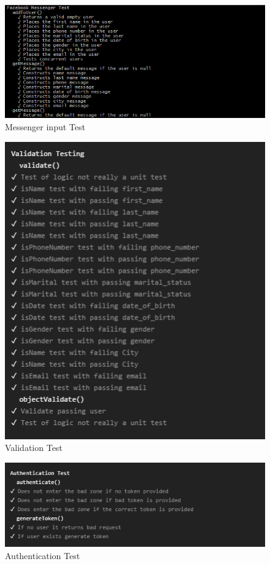 \documentclass{article}
\begin{document}
	
	\begin{figure}[H]
	\includegraphics[width=15cm]{images/messengerTest.png}
	\caption{Messenger input Test}
	\end{figure}	
	
	
	\begin{figure}[H]
	\includegraphics[width=15cm]{images/validationTest.png}
	\caption{Validation Test}
	\end{figure}	
	
	
	\begin{figure}[H]
	\includegraphics[width=15cm]{images/authTest.png}
	\caption{Authentication Test}
	\end{figure}	
	
\end{document}
